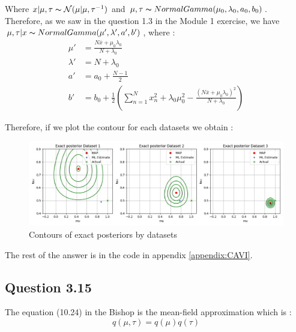 \documentclass{article}
\begin{document}
Where $x|\mu, \tau \thicksim \mathcal{N}(\mu|\mu, \tau^{-1})$ and $\mu, \tau \thicksim NormalGamma(\mu_0, \lambda_0, a_0, b_0)$.
Therefore, as we saw in the question 1.3 in the Module 1 exercise, we have $\mu, \tau|x \thicksim NormalGamma(\mu', \lambda', a', b')$, where :
\begin{equation}
    \begin{split}
        \mu'     & = \frac{N\overline{x} + \mu_0\lambda_0}{N + \lambda_0}                                                                                       \\
        \lambda' & = N + \lambda_0                                                                                                                              \\
        a'       & = a_0 + \frac{N-1}{2}                                                                                                                        \\
        b'       & = b_0 + \frac{1}{2}\left(\sum_{n=1}^{N}x_n^2 + \lambda_0\mu_0^2 - \frac{\left(N\overline{x} + \mu_0\lambda_0\right)^2}{N + \lambda_0}\right)
    \end{split}
\end{equation}

Therefore, if we plot the contour for each datasets we obtain :
\begin{figure}[H]
    \centering
    \includegraphics[scale=0.5]{images/14_contours.png}
    \caption{Contours of exact posteriors by datasets}
    \label{fig:3.14}
\end{figure}

The rest of the answer is in the code in appendix \ref{appendix:CAVI}.

\subsection*{Question 3.15}

The equation (10.24) in the Bishop is the mean-field approximation which is :
\begin{equation}
    q(\mu, \tau) = q(\mu)q(\tau)
\end{equation}
\end{document}
